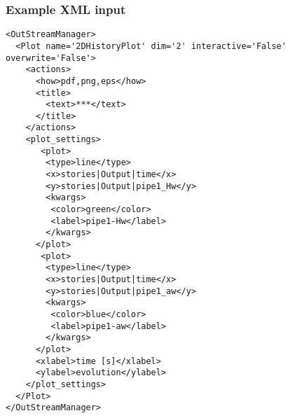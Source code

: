 \subsubsection{Example XML input}
\begin{lstlisting}[style=XML,morekeywords={name,dim,interactive,overwrite}]
<OutStreamManager>
  <Plot name='2DHistoryPlot' dim='2' interactive='False' overwrite='False'>
    <actions>
      <how>pdf,png,eps</how>
      <title>
        <text>***</text>
      </title>
    </actions>
    <plot_settings>
       <plot>
        <type>line</type>
        <x>stories|Output|time</x>
        <y>stories|Output|pipe1_Hw</y>
        <kwargs>
         <color>green</color>
         <label>pipe1-Hw</label>
        </kwargs>
      </plot>
       <plot>
        <type>line</type>
        <x>stories|Output|time</x>
        <y>stories|Output|pipe1_aw</y>
        <kwargs>
         <color>blue</color>
         <label>pipe1-aw</label>
        </kwargs>
      </plot>
      <xlabel>time [s]</xlabel>
      <ylabel>evolution</ylabel>
    </plot_settings>
  </Plot>
</OutStreamManager>
\end{lstlisting}
